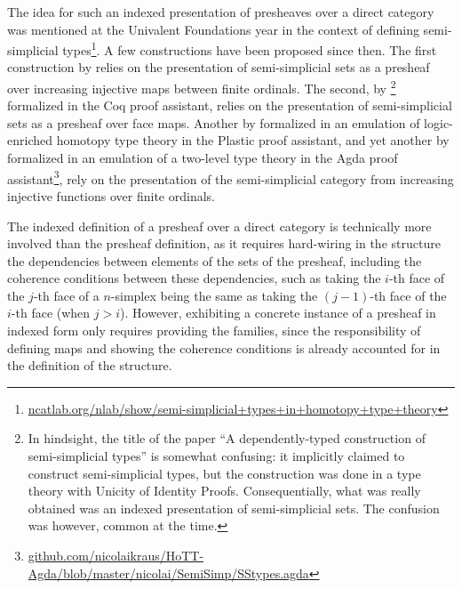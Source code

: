 \documentclass{msc}
\begin{document}
The idea for such an indexed presentation of presheaves over a direct category was mentioned at the Univalent Foundations year in the context of defining semi-simplicial types\footnote{\href{https://ncatlab.org/nlab/show/semi-simplicial+types+in+homotopy+type+theory}{ncatlab.org/nlab/show/semi-simplicial+types+in+homotopy+type+theory}}. A few constructions have been proposed since then. The first construction by \cite{voevodsky12} relies on the presentation of semi-simplicial sets as a presheaf over increasing injective maps between finite ordinals. The second, by \cite{herbelin15}\footnote{In hindsight, the title of the paper ``A dependently-typed construction of semi-simplicial types'' is somewhat confusing: it implicitly claimed to construct semi-simplicial types, but the construction was done in a type theory with Unicity of Identity Proofs. Consequentially, what was really obtained was an indexed presentation of semi-simplicial sets. The confusion was however, common at the time.} formalized in the Coq proof assistant, relies on the presentation of semi-simplicial sets as a presheaf over face maps. Another by \cite{part15} formalized in an emulation of logic-enriched homotopy type theory in the Plastic proof assistant, and yet another by \cite{annenkovCK17} formalized in an emulation of a two-level type theory in the Agda proof assistant\footnote{\href{https://github.com/nicolaikraus/HoTT-Agda/blob/master/nicolai/SemiSimp/SStypes.agda}{github.com/nicolaikraus/HoTT-Agda/blob/master/nicolai/SemiSimp/SStypes.agda}}, rely on the presentation of the semi-simplicial category from increasing injective functions over finite ordinals.

The indexed definition of a presheaf over a direct category is technically more involved than the presheaf definition, as it requires hard-wiring in the structure the dependencies between elements of the sets of the presheaf, including the coherence conditions between these dependencies, such as taking the $i$-th face of the $j$-th face of a $n$-simplex being the same as taking the $(j-1)$-th face of the $i$-th face (when $j>i$). However, exhibiting a concrete instance of a presheaf in indexed form only requires providing the families, since the responsibility of defining maps and showing the coherence conditions is already accounted for in the definition of the structure.
\end{document}
